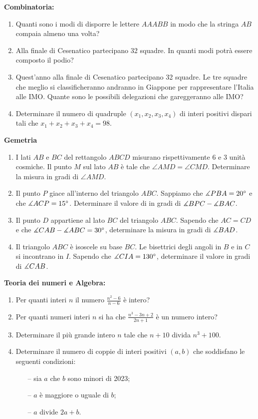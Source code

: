 \documentclass{article}
\begin{document}
\pagestyle{fancy}
\fancyhf{}

\textbf{Combinatoria:}
\begin{enumerate}
	\item Quanti sono i modi di disporre le
		lettere $AAABB$ in modo che la stringa $AB$ compaia almeno una volta?
	\item Alla finale di Cesenatico partecipano 32 squadre. In quanti modi
		potrà essere composto il podio?
	\item Quest'anno alla finale di Cesenatico partecipano 32 squadre.
		Le tre squadre che meglio si classificheranno
		andranno in Giappone per rappresentare l'Italia alle IMO.
		Quante sono le possibili delegazioni che gareggeranno alle IMO?
	\item Determinare il numero di quadruple	$(x_1,x_2,x_3,x_4)$
		di interi positivi dispari tali che $x_1+x_2+x_3+x_4=98$.
\end{enumerate}

\textbf{Gemetria}
\begin{enumerate}

	\item I lati $AB$ e $BC$ del rettangolo $ABCD$ misurano
		rispettivamente $6$ e $3$ unità cosmiche.
		Il punto $M$ sul lato $AB$ è tale che $\angle{AMD}=\angle{CMD}$.
		Determinare la misura in gradi di $\angle{AMD}$.

	\item Il punto $P$ giace all'interno del triangolo $ABC$.
		Sappiamo che $\measuredangle{PBA}=20^\circ$ e che $\measuredangle{ACP}=15^\circ$.
		Determinare il valore di in gradi di $\measuredangle{BPC}-\measuredangle{BAC}$.
	
	\item Il punto $D$ appartiene al lato $BC$
		del triangolo $ABC$. Sapendo che $AC=CD$ e che
		$\measuredangle{CAB}-\measuredangle{ABC}=30^{\circ}$,
		determinare la misura in gradi di $\measuredangle{BAD}$.

	\item Il triangolo $ABC$ è isoscele su base $BC$. Le bisettrici
		degli angoli in $B$ e in $C$ si incontrano in $I$.
		Sapendo che $\measuredangle{CIA}=130^\circ$, determinare
		il valore in gradi di $\measuredangle{CAB}$.
\end{enumerate}

\textbf{Teoria dei numeri e Algebra:}
\begin{enumerate}
	\item Per quanti interi
		$n$ il numero $\frac{n^2-6}{n-6}$ è intero?
	\item Per quanti numeri interi  $n$ si
		ha che $\frac{n^3-3n+2}{2n+1}$ è un numero intero?
	\item Determinare il più grande intero $n$
		tale che $n+10$ divida $n^3+100$.
	\item Determinare il numero di coppie di interi positivi $(a,b)$
		che soddisfano le seguenti condizioni:
		\begin{enumerate}
			\item[--] sia $a$ che $b$ sono minori di 2023;
			\item[--] $a$ è maggiore o uguale di $b$;
			\item[--] $a$ divide $2a+b$.
		\end{enumerate}
\end{enumerate}
\end{document}
